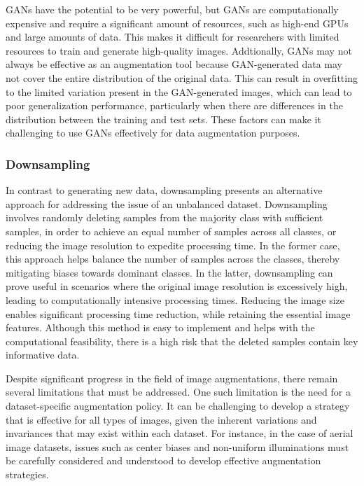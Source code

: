GANs have the potential to be very powerful, but GANs are computationally expensive and require a significant amount of resources, such as high-end GPUs and large amounts of data. This makes it difficult for researchers with limited resources to train and generate high-quality images. Addtionally, GANs may not always be effective as an augmentation tool because GAN-generated data may not cover the entire distribution of the original data. This can result in overfitting to the limited variation present in the GAN-generated images, which can lead to poor generalization performance, particularly when there are differences in the distribution between the training and test sets. These factors can make it challenging to use GANs effectively for data augmentation purposes.

\subsubsection{Downsampling}
In contrast to generating new data, downsampling presents an alternative approach for addressing the issue of an unbalanced dataset. Downsampling involves randomly deleting samples from the majority class with sufficient samples, in order to achieve an equal number of samples across all classes, or reducing the image resolution to expedite processing time. In the former case, this approach helps balance the number of samples across the classes, thereby mitigating biases towards dominant classes. In the latter, downsampling can prove useful in scenarios where the original image resolution is excessively high, leading to computationally intensive processing times. Reducing the image size enables significant processing time reduction, while retaining the essential image features. Although this method is easy to implement and helps with the computational feasibility, there is a high risk that the deleted samples contain key informative data.

Despite significant progress in the field of image augmentations, there remain several limitations that must be addressed. One such limitation is the need for a dataset-specific augmentation policy. It can be challenging to develop a strategy that is effective for all types of images, given the inherent variations and invariances that may exist within each dataset. For instance, in the case of aerial image datasets, issues such as center biases and non-uniform illuminations must be carefully considered and understood to develop effective augmentation strategies.

    
        